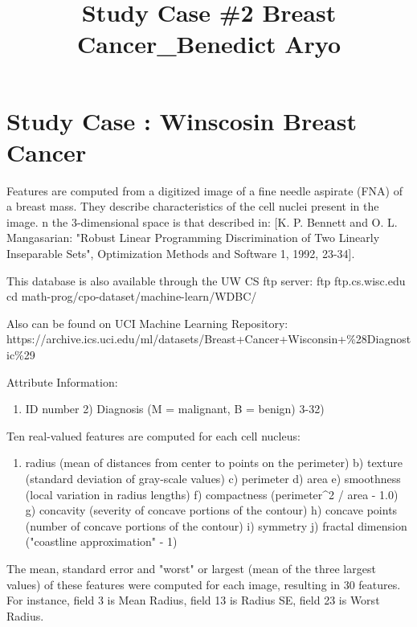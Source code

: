 \documentclass[11pt]{article}
\title{Study Case \#2 Breast Cancer\_Benedict Aryo}
\providecommand{\tightlist}{%
      \setlength{\itemsep}{0pt}\setlength{\parskip}{0pt}}
\begin{document}
    
    
    \maketitle
    
    

    
    \section{Study Case : Winscosin Breast
Cancer}\label{study-case-winscosin-breast-cancer}

    Features are computed from a digitized image of a fine needle aspirate
(FNA) of a breast mass. They describe characteristics of the cell nuclei
present in the image. n the 3-dimensional space is that described in:
{[}K. P. Bennett and O. L. Mangasarian: "Robust Linear Programming
Discrimination of Two Linearly Inseparable Sets", Optimization Methods
and Software 1, 1992, 23-34{]}.

This database is also available through the UW CS ftp server: ftp
ftp.cs.wisc.edu cd math-prog/cpo-dataset/machine-learn/WDBC/

Also can be found on UCI Machine Learning Repository:
https://archive.ics.uci.edu/ml/datasets/Breast+Cancer+Wisconsin+\%28Diagnostic\%29

Attribute Information:

\begin{enumerate}
\def\labelenumi{\arabic{enumi})}
\tightlist
\item
  ID number 2) Diagnosis (M = malignant, B = benign) 3-32)
\end{enumerate}

Ten real-valued features are computed for each cell nucleus:

\begin{enumerate}
\def\labelenumi{\alph{enumi})}
\tightlist
\item
  radius (mean of distances from center to points on the perimeter) b)
  texture (standard deviation of gray-scale values) c) perimeter d) area
  e) smoothness (local variation in radius lengths) f) compactness
  (perimeter\^{}2 / area - 1.0) g) concavity (severity of concave
  portions of the contour) h) concave points (number of concave portions
  of the contour) i) symmetry j) fractal dimension ("coastline
  approximation" - 1)
\end{enumerate}

The mean, standard error and "worst" or largest (mean of the three
largest values) of these features were computed for each image,
resulting in 30 features. For instance, field 3 is Mean Radius, field 13
is Radius SE, field 23 is Worst Radius.
\end{document}

